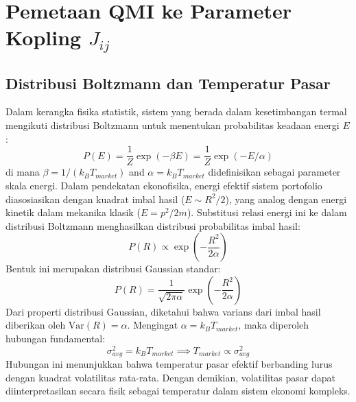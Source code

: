 \section{Pemetaan QMI ke Parameter Kopling $J_{ij}$}

\subsection{Distribusi Boltzmann dan Temperatur Pasar}
Dalam kerangka fisika statistik, sistem yang berada dalam kesetimbangan termal mengikuti distribusi Boltzmann untuk menentukan probabilitas keadaan energi $E$:
\begin{equation}
P(E) = \frac{1}{Z} \exp(-\beta E) = \frac{1}{Z} \exp(-E/\alpha)
\label{eq:boltzmann_alpha_appendix}
\end{equation}
di mana $\beta = 1/(k_B T_{market})$ and $\alpha = k_B T_{market}$ didefinisikan sebagai parameter skala energi. Dalam pendekatan ekonofisika, energi efektif sistem portofolio diasosiasikan dengan kuadrat imbal hasil ($E \sim R^2/2$), yang analog dengan energi kinetik dalam mekanika klasik ($E = p^2/2m$). Substitusi relasi energi ini ke dalam distribusi Boltzmann menghasilkan distribusi probabilitas imbal hasil:
\begin{equation}
P(R) \propto \exp\left(-\frac{R^2}{2\alpha}\right)
\end{equation}
Bentuk ini merupakan distribusi Gaussian standar:
\begin{equation}
P(R) = \frac{1}{\sqrt{2\pi\alpha}} \exp\left(-\frac{R^2}{2\alpha}\right)
\end{equation}
Dari properti distribusi Gaussian, diketahui bahwa varians dari imbal hasil diberikan oleh $\text{Var}(R) = \alpha$. Mengingat $\alpha = k_B T_{market}$, maka diperoleh hubungan fundamental:
\begin{equation}
\sigma_{avg}^2 = k_B T_{market} \implies T_{market} \propto \sigma_{avg}^2
\end{equation}
Hubungan ini menunjukkan bahwa temperatur pasar efektif berbanding lurus dengan kuadrat volatilitas rata-rata. Dengan demikian, volatilitas pasar dapat diinterpretasikan secara fisik sebagai temperatur dalam sistem ekonomi kompleks.


